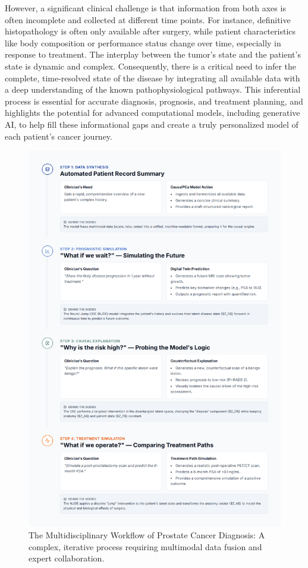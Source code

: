 \documentclass[11pt, a4paper]{article}
\begin{document}
However, a significant clinical challenge is that information from both axes is often incomplete and collected at different time points. For instance, definitive histopathology is often only available after surgery, while patient characteristics like body composition or performance status change over time, especially in response to treatment. The interplay between the tumor's state and the patient's state is dynamic and complex. Consequently, there is a critical need to infer the complete, time-resolved state of the disease by integrating all available data with a deep understanding of the known pathophysiological pathways. This inferential process is essential for accurate diagnosis, prognosis, and treatment planning, and highlights the potential for advanced computational models, including generative AI, to help fill these informational gaps and create a truly personalized model of each patient's cancer journey.


\begin{figure}[H]
    \centering
    \includegraphics[width=1\textwidth]{wf.png}
    \caption{The Multidisciplinary Workflow of Prostate Cancer Diagnosis: A complex, iterative process requiring multimodal data fusion and expert collaboration.}
    \label{fig:workflow}
\end{figure}
\end{document}
